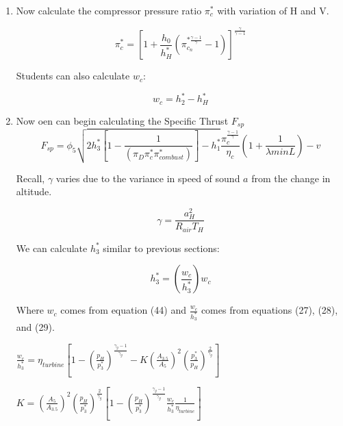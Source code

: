 \documentclass[titlepage]{article}
\begin{document}
\begin{enumerate}
   \item Now calculate the compressor pressure ratio $\pi_{c}^{*}$ with variation of H and V.
   
   \begin{equation}
    \pi_{c}^{*} = \left[ 1+ \frac{h_{0}}{h_{H}^{*}}\left(\pi_{c_{n}}^{* \frac{\gamma-1}{\gamma}} - 1\right) \right] ^{\frac{\gamma}{\gamma-1}}
   \end{equation}

   Students can also calculate $w_{c}$:

   \begin{equation}
    w_{c} = h_{2}^{*} - h_{H}^{*}
   \end{equation}

   \item Now oen can begin calculating the Specific Thrust $F_{sp}$
   \begin{equation}
    F_{sp} = \phi_{5} \sqrt{2h_{3}^{*}\left[1-\frac{1}{(\pi_{D} \pi_{c}^{*} \pi_{combust}^{*})} \right] - h_{1}^{*}}\frac{\pi_{c}^{\frac{\gamma-1}{\gamma}}}{\eta_{c}}\left(1+\frac{1}{\lambda minL}\right) - v
    \end{equation}

  Recall, $\gamma$ varies due to the variance in speed of sound $a$ from the change in altitude.
  
  \begin{equation}
    \gamma = \frac{a_{H}^{2}}{R_{air}T_{H}}
  \end{equation}

  We can calculate $h_{3}^{*}$ similar to previous sections:

  \begin{equation}
    h_{3}^{*} = \left(\frac{w_{c}}{h_{3}^{*}}\right) w_{c}
  \end{equation}
  
  Where $w_{c}$ comes from equation (44) and $\frac{w_{c}}{h_{3}^{*}}$ comes from equations (27), (28), and (29).

  \begin{center}
  
    $\frac{w_{c}}{h_{3}^{*}} = \eta_{turbine} \left[ 1 - \left(\frac{p_{H}}{p_{3}^{*}}\right)^{\frac{\gamma_{g}-1}{\gamma_{g}}} - K \left(\frac{A_{3.5}}{A_{5}}\right)^{2} \left(\frac{p_{3}^{*}}{p_{H}}\right)^{\frac{2}{\gamma_{g}}} \right] $


    $K = \left(\frac{A_{5}}{A_{3.5}}\right)^{2} \left(\frac{p_{H}}{p_{3}^{*}}\right)^{\frac{2}{\gamma_{g}}}\left[1 - \left(\frac{p_{H}}{p_{3}^{*}}\right)^{\frac{\gamma_{g}-1}{\gamma_{g}}} \frac{w_{c}}{h_{3}^{*}} \frac{1}{\eta_{turbine}}\right] $



\end{center}
\end{enumerate}
\end{document}
